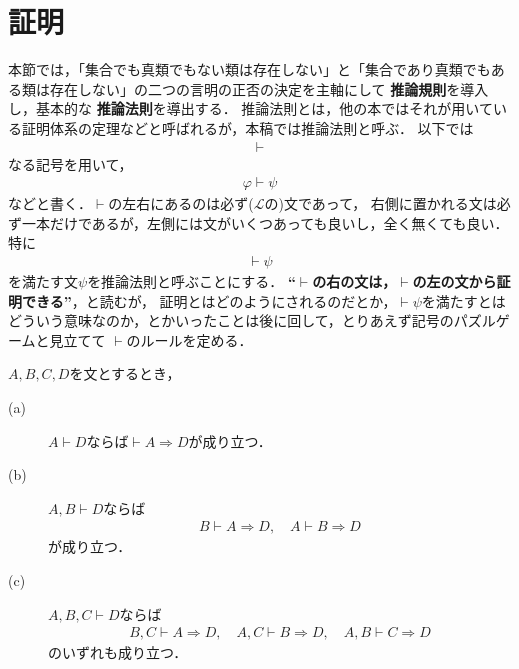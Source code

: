 \section{証明}
	本節では，「集合でも真類でもない類は存在しない」と「集合であり真類でもある類は存在しない」の二つの言明の正否の決定を主軸にして
	{\bf 推論規則}を導入し，基本的な
	{\bf 推論法則}を導出する．
	推論法則とは，他の本ではそれが用いている証明体系の定理などと呼ばれるが，本稿では推論法則と呼ぶ．
	以下では
	\begin{align}
		\vdash
	\end{align}
	なる記号を用いて，
	\begin{align}
		\varphi \vdash \psi
	\end{align}
	などと書く．$\vdash$の左右にあるのは必ず($\mathcal{L}$の)文であって，
	右側に置かれる文は必ず一本だけであるが，左側には文がいくつあっても良いし，全く無くても良い．
	特に
	\begin{align}
		\vdash \psi
	\end{align}
	を満たす文$\psi$を推論法則と呼ぶことにする．
	{\bf ``$\vdash$の右の文は，$\vdash$の左の文から証明できる''}，と読むが，
	証明とはどのようにされるのだとか，$\vdash \psi$を満たすとは
	どういう意味なのか，とかいったことは後に回して，とりあえず記号のパズルゲームと見立てて
	$\vdash$のルールを定める．
	
	\begin{screen}
		\begin{logicalaxm}[演繹規則]
			$A,B,C,D$を文とするとき，
			\begin{description}
				\item[(a)] $A \vdash D$ならば$\vdash A \Longrightarrow D$が成り立つ．
				\item[(b)] $A,B \vdash D$ならば
					\begin{align}
						B \vdash A \Longrightarrow D,\quad
						A \vdash B \Longrightarrow D
					\end{align}
					が成り立つ．
				\item[(c)] $A,B,C \vdash D$ならば
					\begin{align}
						B,C \vdash A \Longrightarrow D,\quad
						A,C \vdash B \Longrightarrow D,\quad
						A,B \vdash C \Longrightarrow D
					\end{align}
					のいずれも成り立つ．
			\end{description}
		\end{logicalaxm}
	\end{screen}
	
